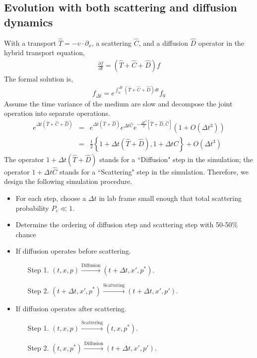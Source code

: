 \documentclass[aps, prc, reprint, amsmath, groupedaddress, nofootinbib]{revtex4-1}
\begin{document}
\begin{appendices}
\section{Evolution with both scattering and diffusion dynamics}
With a transport $\hat{T} = -v\cdot \partial_x$, a scattering $\hat{C}$, and a diffusion $\hat{D}$ operator in the hybrid transport equation,
\begin{eqnarray}
\frac{\partial f}{\partial t} = \left( \hat{T} + \hat{C} + \hat{D} \right) f
\end{eqnarray}
The formal solution is,
\begin{eqnarray}
f_{\Delta t} = e^{\int_0^{\Delta t}  \left( \hat{T} + \hat{C} + \hat{D} \right) dt}f_0
\end{eqnarray}
Assume the time variance of the medium are slow and decompose the joint operation into separate operations.
\begin{eqnarray}
e^{ \Delta t\left(\hat{T} +\hat{C} + \hat{D} \right)} &=&
\nonumber
e^{\Delta t \left(\hat{T} + \hat{D}\right) } e^{\Delta t \hat{C}}   e^{-\frac{\Delta t^2}{2} [\hat{T}+\hat{D}, \hat{C}]}\left(1+O(\Delta t^3)\right) \\
\nonumber
&=& \frac{1}{2}  \left\{
1+\Delta t \left( \hat{T}+\hat{D} \right), 1+\Delta t C
\right\} + O(\Delta t^3) 
\end{eqnarray}
The operator $1 + \Delta t ( \hat{T}  + \hat{D} )$ stands for a ``Diffusion" step in the simulation; the operator $1+\Delta t \hat{C}$ stands for a ``Scattering" step in the simulation. 
Therefore, we design the following simulation procedure.
\begin{itemize}
\item For each step, choose a $\Delta t$ in lab frame small enough that total scattering probability $P_c \ll 1$.
\item Determine the ordering of diffusion step and scattering step with 50-50\% chance
\item If diffusion operates before scattering.
\begin{itemize}
\item[Step 1.] $(t, x, p) \xrightarrow{\textrm{Diffusion}} (t+\Delta t, x', p^*)$.
\item[Step 2.] $(t+\Delta t, x', p^*) \xrightarrow{\textrm{Scattering}} (t+\Delta t, x', p')$.
\end{itemize}
\item If diffusion operates after scattering.
\begin{itemize}
\item[Step 1.] $(t, x, p) \xrightarrow{\textrm{Scattering}} (t, x, p^*)$.
\item[Step 2.] $(t, x, p^*)  \xrightarrow{\textrm{Diffusion}} (t+\Delta t, x', p')$.
\end{itemize}
\end{itemize}


\end{appendices}
\end{document}
